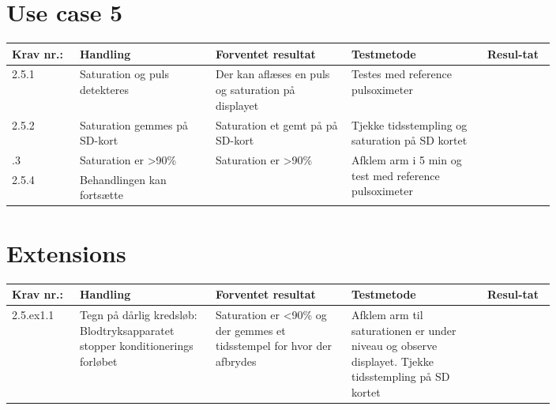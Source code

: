 \section{Use case 5}
					\begin{longtable}{|p{0.1\linewidth}|p{0.2\linewidth}|p{0.2\linewidth}|p{0.2\linewidth}|p{0.1\linewidth}|}
							\hline
							Krav nr.: & Handling & Forventet resultat & Testmetode & Resul-tat  \\\hline
							2.5.1 & Saturation og puls detekteres & Der kan aflæses en puls og saturation på displayet& Testes med reference pulsoximeter & \\ \hline
							2.5.2 & Saturation gemmes på SD-kort & Saturation et gemt på på SD-kort & Tjekke tidsstempling og saturation på SD kortet & \\ \hline
							\pagebreak \hline
							2.5.3 & Saturation er \textgreater90\%  & \multirow{2}{\linewidth}{Saturation er \textgreater90\% } & \multirow{2}{\linewidth}{Afklem arm i 5 min og test med reference pulsoximeter} & \multirow{2}{\linewidth}{}  \\ \cline{1-2}
							2.5.4 & Behandlingen kan fortsætte & & & \\ \hline
					\end{longtable}
					
					\section*{Extensions}
					\begin{longtable}{|p{0.1\linewidth}|p{0.2\linewidth}|p{0.2\linewidth}|p{0.2\linewidth}|p{0.1\linewidth}|}
						\hline
						Krav nr.: & Handling & Forventet resultat & Testmetode & Resul-tat  \\\hline
						2.5.ex1.1 & Tegn på dårlig kredsløb: Blodtryksapparatet stopper konditionerings forløbet & Saturation er \textless90\% og der gemmes et tidsstempel for hvor der afbrydes & Afklem arm til saturationen er  under niveau og observe displayet.
						Tjekke tidsstempling på SD kortet & \\ \hline
					\end{longtable}